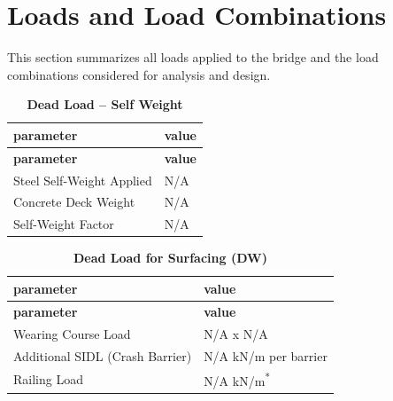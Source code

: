 \documentclass[12pt,a4paper]{report}
\numberwithin{table}{chapter}
\numberwithin{figure}{chapter}
\newcommand{\sdstar}{\textsuperscript{*}}
\newcommand{\ReportTableSetup}{%
  \setlength{\tabcolsep}{3.0pt}%
  \renewcommand{\arraystretch}{1.18}%
  \setlength{\arrayrulewidth}{0.4pt}\setlength{\extrarowheight}{0.5pt}%
  \setlength{\LTleft}{\fill}\setlength{\LTright}{\fill}%
  \setlength{\LTpre}{4pt}\setlength{\LTpost}{8pt}}
\newcommand{\ReportTableFont}{\small}
\newcommand{\ReportRowGap}{3.0pt}
\newcommand{\ReportTableGap}{\vspace{0.5em}}
\begin{document}
\setcounter{chapter}{2}
\chapter{Loads and Load Combinations}

This section summarizes all loads applied to the bridge and the load combinations considered for analysis and design.

\ReportTableGap
\begingroup
\ReportTableSetup
\ReportTableFont
\begin{longtable}{|L{5.5000cm}|p{10.0000cm}|}
\caption{\textbf{Dead Load -- Self Weight}}\\
\hline
\textbf{parameter} & \textbf{value} \\
\hline
\endfirsthead
\hline
\textbf{parameter} & \textbf{value} \\
\hline
\endhead
\hline
\endfoot
\hline
\endlastfoot

\textnormal{Steel Self-Weight Applied} & N/A \\[\ReportRowGap]
\hline
\textnormal{Concrete Deck Weight} & N/A \\[\ReportRowGap]
\hline
\textnormal{Self-Weight Factor} & N/A \\[\ReportRowGap]
\hline
\end{longtable}
\endgroup

\ReportTableGap
\begingroup
\ReportTableSetup
\ReportTableFont
\begin{longtable}{|L{5.5000cm}|p{10.0000cm}|}
\caption{\textbf{Dead Load for Surfacing (DW)}}\\
\hline
\textbf{parameter} & \textbf{value} \\
\hline
\endfirsthead
\hline
\textbf{parameter} & \textbf{value} \\
\hline
\endhead
\hline
\endfoot
\hline
\endlastfoot

\textnormal{Wearing Course Load} & N/A x N/A \\[\ReportRowGap]
\hline
\textnormal{Additional SIDL (Crash Barrier)} & N/A kN/m per barrier \\[\ReportRowGap]
\hline
\textnormal{Railing Load} & N/A kN/m\sdstar{} \\[\ReportRowGap]
\hline
\end{longtable}
\endgroup
\end{document}
